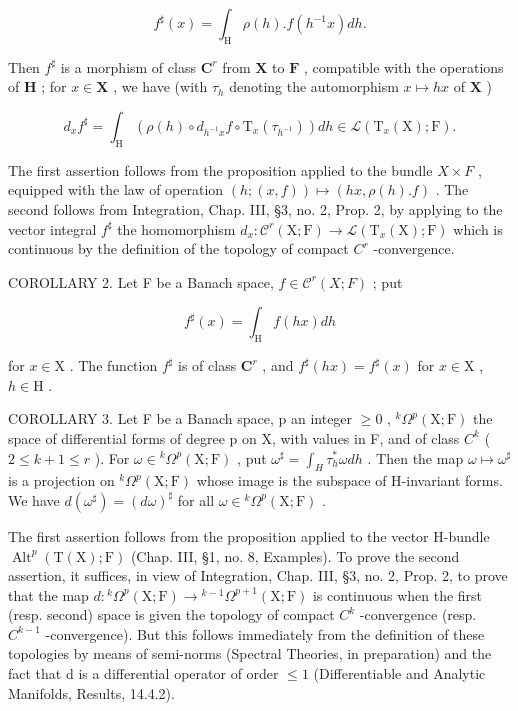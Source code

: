 \[
f ^ {\sharp} (x) = \int_ {\mathrm{H}} \rho (h). f (h ^ {- 1} x) d h.
\]

Then \(f^{\sharp}\) is a morphism of class \(\mathbf{C}^r\) from \(\mathbf{X}\) to \(\mathbf{F}\) , compatible with the operations of \(\mathbf{H}\) ; for \(x \in \mathbf{X}\) , we have (with \(\tau_h\) denoting the automorphism \(x \mapsto hx\) of \(\mathbf{X}\) )

\[
d _ {x} f ^ {\sharp} = \int_ {\mathrm{H}} (\rho (h) \circ d _ {h ^ {- 1} x} f \circ \mathrm{T} _ {x} (\tau_ {h ^ {- 1}})) d h \in \mathscr {L} (\mathrm{T} _ {x} (\mathrm{X}); \mathrm{F}).\tag{14}
\]

The first assertion follows from the proposition applied to the bundle \(X \times F\) , equipped with the law of operation \((h; (x, f)) \mapsto (hx, \rho(h).f)\) . The second follows from Integration, Chap. III, §3, no. 2, Prop. 2, by applying to the vector integral \(f^{\sharp}\) the homomorphism \(d_{x} : \mathcal{C}^{r}(\mathrm{X};\mathrm{F}) \to \mathcal{L}(\mathrm{T}_{x}(\mathrm{X});\mathrm{F})\) which is continuous by the definition of the topology of compact \(C^{r}\) -convergence.

COROLLARY 2. Let F be a Banach space, \(f \in \mathcal{C}^{r}(X;F)\) ; put

\[
f ^ {\sharp} (x) = \int_ {\mathrm{H}} f (h x) d h
\]

for \(x \in \mathrm{X}\) . The function \(f^{\sharp}\) is of class \(\mathbf{C}^r\) , and \(f^{\sharp}(hx) = f^{\sharp}(x)\) for \(x \in \mathrm{X}\) , \(h \in \mathrm{H}\) .

COROLLARY 3. Let F be a Banach space, p an integer \(\geq 0\) , \(^{k}\Omega^{p}(\mathrm{X};\mathrm{F})\) the space of differential forms of degree p on X, with values in F, and of class \(C^{k}\) ( \(2 \leq k + 1 \leq r\) ). For \(\omega \in {}^{k}\Omega^{p}(\mathrm{X};\mathrm{F})\) , put \(\omega^{\sharp} = \int_{H} \tau_{h}^{*}\omega dh\) . Then the map \(\omega \mapsto \omega^{\sharp}\) is a projection on \(^{k}\Omega^{p}(\mathrm{X};\mathrm{F})\) whose image is the subspace of H-invariant forms. We have \(d(\omega^{\sharp}) = (d\omega)^{\sharp}\) for all \(\omega \in {}^{k}\Omega^{p}(\mathrm{X};\mathrm{F})\) .

The first assertion follows from the proposition applied to the vector H-bundle \(\operatorname{Alt}^{p}(\mathrm{T}(\mathrm{X});\mathrm{F})\) (Chap. III, §1, no. 8, Examples). To prove the second assertion, it suffices, in view of Integration, Chap. III, §3, no. 2, Prop. 2, to prove that the map \(d:{}^{k}\varOmega^{p}(\mathrm{X};\mathrm{F})\to{}^{k-1}\varOmega^{p+1}(\mathrm{X};\mathrm{F})\) is continuous when the first (resp. second) space is given the topology of compact \(C^{k}\) -convergence (resp. \(C^{k-1}\) -convergence). But this follows immediately from the definition of these topologies by means of semi-norms (Spectral Theories, in preparation) and the fact that d is a differential operator of order \(\leq 1\) (Differentiable and Analytic Manifolds, Results, 14.4.2).

